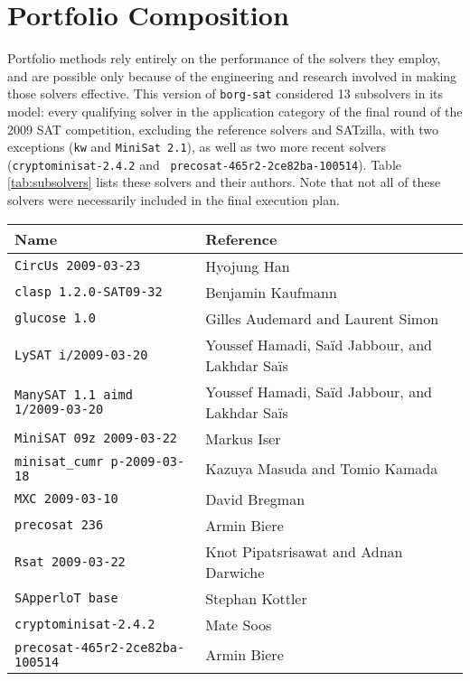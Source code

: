 \section{\label{sec:subsolvers}Portfolio Composition}

Portfolio methods rely entirely on the performance of the solvers they employ,
and are possible only because of the engineering and research involved in
making those solvers effective. This version of {\tt borg-sat} considered 13
subsolvers in its model: every qualifying solver in the application category of
the final round of the 2009 SAT competition, excluding the reference solvers
and SATzilla, with two exceptions ({\tt kw} and {\tt MiniSat 2.1}), as well as
two more recent solvers ({\tt cryptominisat-2.4.2} and {\tt
precosat-465r2-2ce82ba-100514}). Table \ref{tab:subsolvers} lists these solvers
and their authors. Note that not all of these solvers were necessarily included
in the final execution plan.

\begin{table*}
\begin{center}
\begin{tabular}{lll}
\toprule
{\bf Name}         & {\bf Reference}\\
\midrule
{\tt CircUs 2009-03-23}             & Hyojung Han\\
{\tt clasp 1.2.0-SAT09-32}          & Benjamin Kaufmann\\
{\tt glucose 1.0}                   & Gilles Audemard and Laurent Simon\\
{\tt LySAT i/2009-03-20}            & Youssef Hamadi, Sa\"{i}d Jabbour, and Lakhdar Sa\"{i}s\\
{\tt ManySAT 1.1 aimd 1/2009-03-20} & Youssef Hamadi, Sa\"{i}d Jabbour, and Lakhdar Sa\"{i}s\\
{\tt MiniSAT 09z 2009-03-22}        & Markus Iser\\
{\tt minisat\_cumr p-2009-03-18}    & Kazuya Masuda and Tomio Kamada\\
{\tt MXC 2009-03-10}                & David Bregman\\
{\tt precosat 236}                  & Armin Biere\\
{\tt Rsat 2009-03-22}               & Knot Pipatsrisawat and Adnan Darwiche\\
{\tt SApperloT base}                & Stephan Kottler\\
{\tt cryptominisat-2.4.2}           & Mate Soos\\
{\tt precosat-465r2-2ce82ba-100514} & Armin Biere\\
\bottomrule
\end{tabular}
\caption{\label{tab:subsolvers}Subsolvers considered by the {\tt
borg-sat-10.06.07} planner.}
\end{center}
\end{table*}

